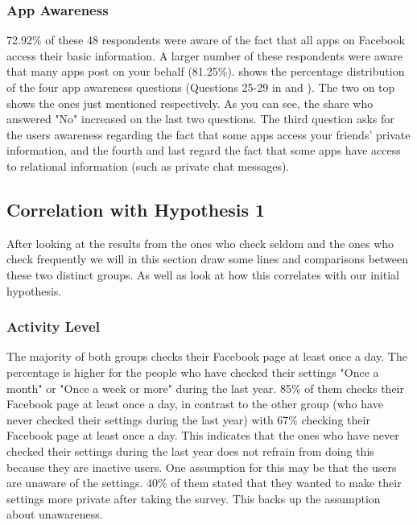 

\subsubsection{App Awareness}
72.92\% of these 48 respondents were aware of the fact that all apps on Facebook access their basic information. A larger number of these respondents were aware that many apps post on your behalf (81.25\%).  shows the percentage distribution of the four app awareness questions (Questions 25-29 in  and ). The two on top shows the ones just mentioned respectively. As you can see, the share who answered "No" increased on the last two questions. The third question asks for the users awareness regarding the fact that some apps access your friends' private information, and the fourth and last regard the fact that some apps have access to relational information (such as private chat messages).  

\subsection{Correlation with Hypothesis 1}
After looking at the results from the ones who check seldom and the ones who check frequently we will in this section draw some lines and comparisons between these two distinct groups. As well as look at how this correlates with our initial hypothesis. 

\subsubsection{Activity Level}
The majority of both groups checks their Facebook page at least once a day. The percentage is higher for the people who have checked their settings "Once a month" or "Once a week or more" during the last year. 85\% of them checks their Facebook page at least once a day, in contrast to the other group (who have never checked their settings during the last year) with 67\% checking their Facebook page at least once a day. This indicates that the ones who have never checked their settings during the last year does not refrain from doing this because they are inactive users. One assumption for this may be that the users are unaware of the settings. 40\% of them stated that they wanted to make their settings more private after taking the survey. This backs up the assumption about unawareness.  

